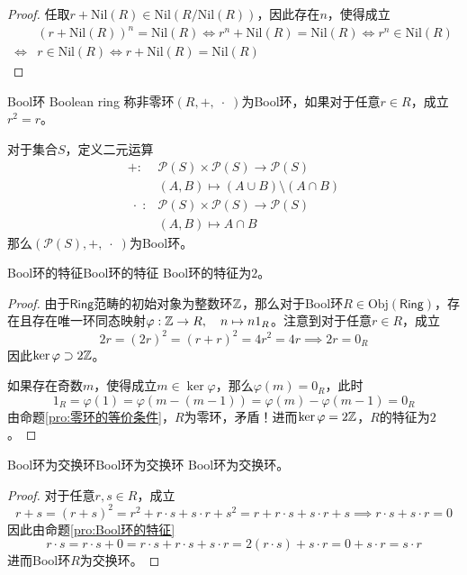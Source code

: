 \begin{proof}
	任取$r+\mathrm{Nil}(R)\in \mathrm{Nil}(R/\mathrm{Nil}(R))$，因此存在$n$​，使得成立
	\begin{align*}
		&(r+\mathrm{Nil}(R))^n=\mathrm{Nil}(R)
		\iff r^n+\mathrm{Nil}(R)=\mathrm{Nil}(R)
		\iff r^n\in \mathrm{Nil}(R)\\
		\iff & r\in\mathrm{Nil}(R)
		\iff r+\mathrm{Nil}(R)=\mathrm{Nil}(R)
	\end{align*}
\end{proof}

\begin{definition}{Bool环 Boolean ring}
	称非零环$(R,+,\;\cdot \;)$为Bool环，如果对于任意$r\in R$，成立$r^2=r$。
\end{definition}

\begin{example}
	对于集合$S$，定义二元运算
	\begin{align*}
		+:&\mathscr{P}(S)\times \mathscr{P}(S)\to \mathscr{P}(S)\\
		&(A,B)\mapsto (A\cup B)\setminus(A\cap B)\\
		\;\cdot\;:&\mathscr{P}(S)\times \mathscr{P}(S)\to \mathscr{P}(S)\\
		&(A,B)\mapsto A\cap B
	\end{align*}
	那么$(\mathscr{P}(S),+,\;\cdot\;)$为Bool环。
\end{example}

\begin{proposition}{Bool环的特征}{Bool环的特征}
	Bool环的特征为$2$。
\end{proposition}

\begin{proof}
	由于$\mathsf{Ring}$范畴的初始对象为整数环$\mathbb{Z}$，那么对于Bool环$R\in \mathrm{Obj}(\mathsf{Ring})$，存在且存在唯一环同态映射$\varphi:\mathbb{Z}\to R,\quad n\mapsto n1_R$。注意到对于任意$r\in R$，成立
	$$
	2r=(2r)^2=(r+r)^2=4r^2=4r\implies 2r=0_R
	$$
	因此$\ker\varphi\supset 2\mathbb{Z}$。
	
	如果存在奇数$m$，使得成立$m\in\ker\varphi$，那么$\varphi(m)=0_R$，此时
	$$
	1_R=\varphi(1)=\varphi(m-(m-1))=\varphi(m)-\varphi(m-1)=0_R
	$$
	由命题\ref{pro:零环的等价条件}，$R$为零环，矛盾！进而$\ker\varphi= 2\mathbb{Z}$，$R$的特征为$2$。
\end{proof}

\begin{proposition}{Bool环为交换环}{Bool环为交换环}
	Bool环为交换环。
\end{proposition}

\begin{proof}
	对于任意$r,s\in R$，成立
	$$
	r+s=(r+s)^2
	=r^2+r\cdot s+s\cdot r+s^2
	=r+r\cdot s+s\cdot r+s
	\implies r\cdot s+s\cdot r=0
	$$
	因此由命题\ref{pro:Bool环的特征}
	$$
	r\cdot s
	=r\cdot s+0
	=r\cdot s+r\cdot s+s\cdot r
	=2(r\cdot s)+s\cdot r
	=0+s\cdot r
	=s\cdot r
	$$
	进而Bool环$R$为交换环。
\end{proof}


